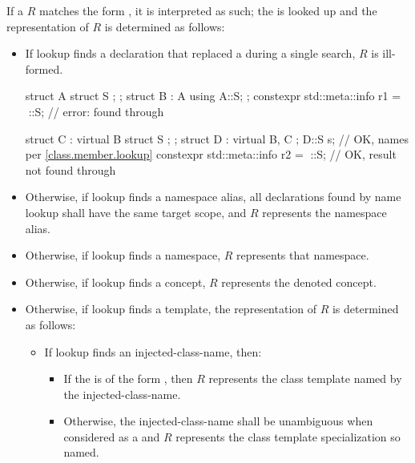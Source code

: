 \pnum
If a  $R$ matches
the form ,
it is interpreted as such;
the  is looked up and
the representation of $R$ is determined as follows:
\begin{itemize}
\item
If lookup finds a declaration
that replaced a 
during a single search,
$R$ is ill-formed.
\begin{example}
\begin{codeblock}
struct A { struct S {}; };
struct B : A { using A::S; };
constexpr std::meta::info r1 = ^^B::S;  // error:  found through 

struct C : virtual B { struct S {}; };
struct D : virtual B, C {};
D::S s;                                 // OK, names  per \ref{class.member.lookup}
constexpr std::meta::info r2 = ^^D::S;  // OK, result  not found through 
\end{codeblock}
\end{example}
\item
Otherwise, if lookup finds a namespace alias,
all declarations found by name lookup shall have the same target scope, and
$R$ represents the namespace alias.
\item
Otherwise, if lookup finds a namespace,
$R$ represents that namespace.
\item
Otherwise, if lookup finds a concept,
$R$ represents the denoted concept.
\item
Otherwise, if lookup finds a template,
the representation of $R$ is determined as follows:
\begin{itemize}
\item
If lookup finds an injected-class-name, then:
\begin{itemize}
\item
If the  is of the form
,
then $R$ represents the class template named by the injected-class-name.
\item
Otherwise, the injected-class-name shall be unambiguous
when considered as a  and
$R$ represents the class template specialization so named.
\end{itemize}

\end{itemize}
\end{itemize}

